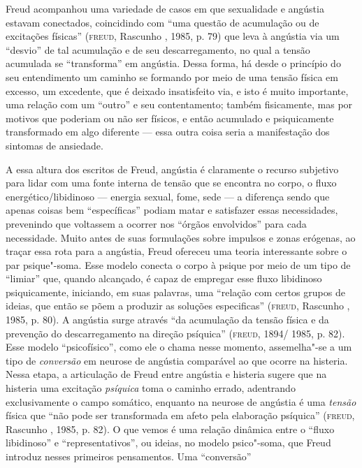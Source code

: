 Freud acompanhou uma variedade de casos em que sexualidade e angústia
estavam conectados, coincidindo com ``uma questão de acumulação ou de
excitações físicas'' (\textsc{freud}, Rascunho , 1985, p. 79) que leva à
angústia via um ``desvio'' de tal acumulação e de seu descarregamento,
no qual a tensão acumulada se ``transforma'' em angústia. Dessa forma,
há desde o princípio do seu entendimento um caminho se formando por meio
de uma tensão física em excesso, um excedente, que é deixado
insatisfeito via, e isto é muito importante, uma relação com um
``outro'' e seu contentamento; também fisicamente, mas por motivos que
poderiam ou não ser físicos, e então acumulado e psiquicamente
transformado em algo diferente --- essa outra coisa seria a manifestação
dos sintomas de ansiedade.

A essa altura dos escritos de Freud, angústia é claramente o recurso
subjetivo para lidar com uma fonte interna de tensão que se encontra no
corpo, o fluxo energético/libidinoso --- energia sexual, fome, sede --- a
diferença sendo que apenas coisas bem ``específicas'' podiam matar e
satisfazer essas necessidades, prevenindo que voltassem a ocorrer nos
``órgãos envolvidos'' para cada necessidade. Muito antes de suas
formulações sobre impulsos e zonas erógenas, ao traçar essa rota para a
angústia, Freud ofereceu uma teoria interessante sobre o par
psique"-soma. Esse modelo conecta o corpo à psique por meio de um tipo de
``limiar'' que, quando alcançado, é capaz de empregar esse fluxo
libidinoso psiquicamente, iniciando, em suas palavras, uma ``relação com
certos grupos de ideias, que então se põem a produzir as soluções
especificas'' (\textsc{freud}, Rascunho , 1985, p. 80). A angústia surge
através ``da acumulação da tensão física e da prevenção do
descarregamento na direção psíquica'' (\textsc{freud}, 1894/ 1985, p. 82). Esse
modelo ``psicofísico'', como ele o chama nesse momento, assemelha"-se a
um tipo de \emph{conversão} em neurose de angústia comparável ao que
ocorre na histeria. Nessa etapa, a articulação de Freud entre angústia e
histeria sugere que na histeria uma excitação \emph{psíquica} toma o
caminho errado, adentrando exclusivamente o campo somático, enquanto na
neurose de angústia é uma \emph{tensão} física que ``não pode ser
transformada em afeto pela elaboração psíquica'' (\textsc{freud}, Rascunho ,
1985, p. 82). O que vemos é uma relação dinâmica entre o ``fluxo
libidinoso'' e ``representativos'', ou ideias, no modelo psico"-soma,
que Freud introduz nesses primeiros pensamentos. Uma ``conversão''
